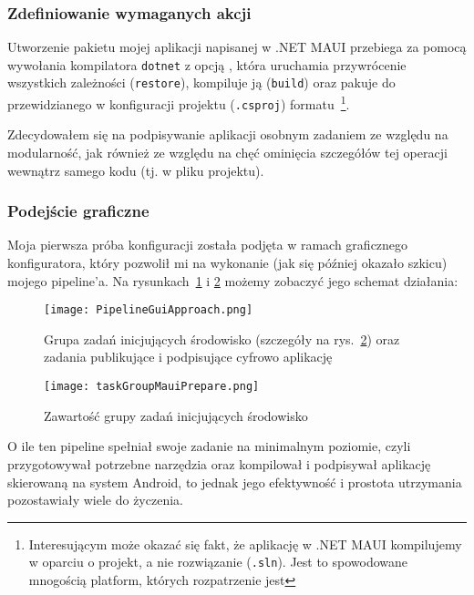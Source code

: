 \subsubsection{Zdefiniowanie wymaganych akcji}
Utworzenie pakietu mojej aplikacji napisanej w .NET MAUI przebiega za pomocą wywołania kompilatora 
\verb|dotnet| z opcją , 
która uruchamia przywrócenie wszystkich zależności (\verb|restore|), 
kompiluje ją (\verb|build|) oraz pakuje do przewidzianego w konfiguracji projektu (\verb|.csproj|) formatu~\cprotect\footnote{%
    Interesującym może okazać się fakt, że aplikację w .NET MAUI kompilujemy w oparciu o projekt, a nie rozwiązanie (\verb|.sln|).
    Jest to spowodowane mnogością platform, których rozpatrzenie jest 
}.

Zdecydowałem się na podpisywanie aplikacji osobnym zadaniem ze względu na modularność,
jak również ze względu na chęć ominięcia szczegółów tej operacji wewnątrz samego kodu (tj. w pliku projektu).

\subsubsection{Podejście graficzne}
Moja pierwsza próba konfiguracji została podjęta w ramach graficznego konfiguratora, 
który pozwolił mi na wykonanie (jak się później okazało szkicu) mojego pipeline'a.
Na rysunkach~\ref{img:PipelineGuiApproach} i \ref{img:taskGroupMauiPrepare} możemy zobaczyć jego schemat działania:\\
\begin{figure}
    \centering
    \texttt{[image: PipelineGuiApproach.png]}
    \caption{Grupa zadań inicjujących środowisko (szczegóły na rys.~\ref{img:taskGroupMauiPrepare}) oraz zadania publikujące i podpisujące cyfrowo aplikację}
    \label{img:PipelineGuiApproach}
\end{figure}
\begin{figure}
    \centering
    \texttt{[image: taskGroupMauiPrepare.png]}
    \caption{Zawartość grupy zadań inicjujących środowisko}
    \label{img:taskGroupMauiPrepare}
\end{figure}
\newpage
O ile ten pipeline spełniał swoje zadanie na minimalnym poziomie, czyli przygotowywał potrzebne narzędzia 
oraz kompilował i podpisywał aplikację skierowaną na system Android, to jednak jego efektywność i prostota 
utrzymania pozostawiały wiele do życzenia.


